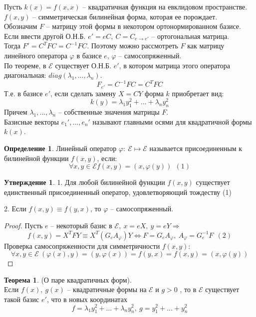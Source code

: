 \documentclass[a4paper, 12pt]{article}
\theoremstyle{definition}
\newtheorem*{definition}{Определение}
\newtheorem*{theorem}{Теорема}
\newtheorem*{subtheorem}{Утверждение}
\begin{document}
    Пусть $k(x) = f(x,x)$ -- квадратичная функция на евклидовом
    пространстве. 
    $f(x,y)$ -- симметрическая билинейная форма, которая ее 
    порождает.\\
    Обозначим $F$ -- матрицу этой формы в некотором 
    ортонормированном базисе.  
    Если ввести другой О.Н.Б. $e' = eC,\ C = C_{e \to e'}$
    -- ортогональная матрица.\\
    Тогда $F' = C^TFC = C^{-1}FC.$ Поэтому можно рассмотреть
    $F$ как матрицу линейного оператора $\varphi$ в базисе $e$,
    $\varphi$ -- самосопряженный.\\
    По теореме, в $\mathcal{E}$ существует О.Н.Б. $e'$, 
    в котором матрица этого оператора диагональная: 
    $diag(\lambda_1,...,\lambda_n)$.
    $$F_{e'} = C^{-1}FC = C^TFC$$
    Т.е. в базисе $e'$, если сделать замену $X = CY$
    форма $k$ приобретает вид: 
    $$k(y) = \lambda_1y_1^2 +...+ \lambda_ny_n^2$$
    Причем $\lambda_1,...,\lambda_n$ -- собственные 
    значения матрицы $F$.\\
    Базисные векторы $e_1',...,e_n'$ называют главными осями
    для квадратичной формы $k(x)$.  
    \begin{definition}
        Линейный оператор $\varphi:\ \mathcal{E} \longmapsto
        \mathcal{E} $ называется присоединенным к билинейной
        функции $f(x,y)$, если: $$\forall x,y \in \mathcal{E}
        f(x,y) = (x,\varphi(y))\ \ (1)$$
    \end{definition}    
    \begin{subtheorem}
        1. Для любой билинейной функции $f(x,y)$ существует
        единственный присоединенный оператор, удовлетворяющий
        тождеству (1)

        2. Если $f(x,y) \equiv f(y,x)$, то $\varphi$ -- 
        самосопряженный. 
    \end{subtheorem}
    \begin{proof}
        Пусть $e$ -- некоторый базис в $\mathcal{E},\ 
        x = eX,\ y = eY \Longrightarrow$
        $$f(x,y) = X^TFY \equiv X^T(G_eA_\varphi)Y
        \Longleftrightarrow F = G_eA_\varphi,\ A_\varphi
        = G_e^{-1}F\ \ (2)$$
        Проверка самосопряженности для симметричности $f(x,y)$:
        $$\forall x,y \in \mathcal{E}\ (\varphi(x),y) = 
        (y,\varphi(x)) = f(y,x) = f(x,y) = (x,\varphi(y))$$         
    \end{proof}
    \begin{theorem}
        (О паре квадратичных форм).\\
        Если $f(x),\ g(x)$ -- квадратичные формы на 
        $\mathcal{E}$ и $g > 0$ , то в $\mathcal{E}$ существует такой 
        базис $e'$, что в новых координатах $$f = \lambda_1y_1^2
        +...+\lambda_ny_n^2,\ g = y_1^2+...+y_n^2$$
    \end{theorem}
\end{document}
